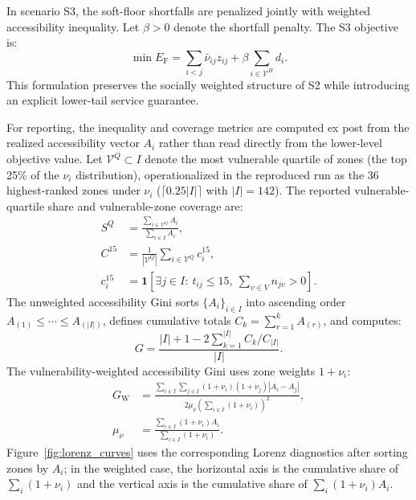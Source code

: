 \documentclass[final,5p,times,twocolumn,authoryear]{elsarticle}
\begin{document}
In scenario S3, the soft-floor shortfalls are penalized jointly with weighted accessibility
inequality. Let $\beta>0$ denote the shortfall penalty. The S3 objective is:
\begin{equation}
\min E_{\mathrm{F}}=\sum_{i<j}\bar{\nu}_{ij}z_{ij}+\beta\sum_{i\in \mathcal{V}^{H}} d_i.
\label{eq:lower_weighted_floor}
\end{equation}
This formulation preserves the socially weighted structure of S2 while introducing an
explicit lower-tail service guarantee.

For reporting, the inequality and coverage metrics are computed ex post from the realized
accessibility vector $A_i$ rather than read directly from the lower-level objective value.
Let $\mathcal{V}^{Q}\subset I$ denote the most vulnerable quartile of zones (the top 25\% of
the $\nu_i$ distribution), operationalized in the reproduced run as the 36 highest-ranked
zones under $\nu_i$ ($\lceil 0.25|I|\rceil$ with $|I|=142$). The reported
vulnerable-quartile share and vulnerable-zone coverage are:
\begin{align}
S^{Q} &= \frac{\sum_{i\in \mathcal{V}^{Q}} A_i}{\sum_{i\in I} A_i},
\label{eq:vulnerable_quartile_share} \\
C^{15} &= \frac{1}{|\mathcal{V}^{Q}|}\sum_{i\in \mathcal{V}^{Q}} c_i^{15},
\label{eq:coverage_threshold_metric} \\
c_i^{15} &= \mathbf{1}\!\left[\exists j\in I:\ t_{ij}\le 15,\ \sum_{v\in V} n_{jv}>0\right].
\nonumber
\end{align}
The unweighted accessibility Gini sorts $\{A_i\}_{i\in I}$ into ascending order
$A_{(1)}\le \cdots \le A_{(|I|)}$, defines cumulative totals
$C_k=\sum_{r=1}^{k}A_{(r)}$, and computes:
\begin{equation}
G=\frac{|I|+1-2\sum_{k=1}^{|I|} C_k/C_{|I|}}{|I|}.
\label{eq:accessibility_gini}
\end{equation}
The vulnerability-weighted accessibility Gini uses zone weights $1+\nu_i$:
\begin{align}
G_{\mathrm{W}} &=
\frac{\sum_{i\in I}\sum_{j\in I}(1+\nu_i)(1+\nu_j)|A_i-A_j|}
{2\mu_{\nu}\left(\sum_{i\in I}(1+\nu_i)\right)^2},
\label{eq:weighted_accessibility_gini} \\
\mu_{\nu} &=
\frac{\sum_{i\in I}(1+\nu_i)A_i}{\sum_{i\in I}(1+\nu_i)}.
\nonumber
\end{align}
Figure~\ref{fig:lorenz_curves} uses the corresponding Lorenz diagnostics after sorting zones
by $A_i$; in the weighted case, the horizontal axis is the cumulative share of
$\sum_i(1+\nu_i)$ and the vertical axis is the cumulative share of
$\sum_i(1+\nu_i)A_i$.
\end{document}
